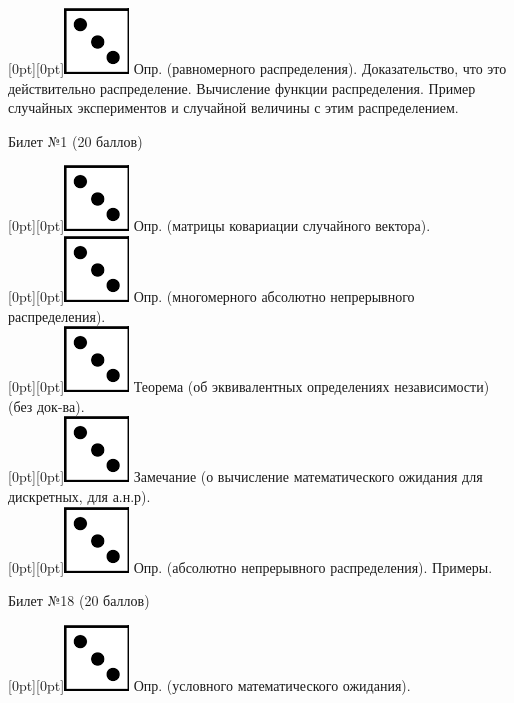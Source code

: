 \documentclass[10pt]{article}
\begin{document}
\raisebox{-1pt}[0pt][0pt]{\includegraphics[width=0.02\linewidth]{3.png}}  Опр. (равномерного распределения). Доказательство, что это действительно распределение. Вычисление функции распределения. Пример случайных экспериментов и случайной величины с этим распределением. \\

\begin{center} {\Large Билет №1 (20 баллов)} \end{center}

\raisebox{-1pt}[0pt][0pt]{\includegraphics[width=0.02\linewidth]{3.png}} Опр. (матрицы ковариации случайного вектора). \\

\raisebox{-1pt}[0pt][0pt]{\includegraphics[width=0.02\linewidth]{3.png}} Опр. (многомерного абсолютно непрерывного распределения). \\

\raisebox{-1pt}[0pt][0pt]{\includegraphics[width=0.02\linewidth]{3.png}} Теорема (об эквивалентных определениях независимости) (без док-ва). \\

\raisebox{-1pt}[0pt][0pt]{\includegraphics[width=0.02\linewidth]{3.png}} Замечание (о вычисление  математического ожидания для дискретных, для а.н.р). \\

\raisebox{-1pt}[0pt][0pt]{\includegraphics[width=0.02\linewidth]{3.png}} Опр. (абсолютно непрерывного распределения). Примеры. \\

\begin{center} {\Large Билет №18 (20 баллов)} \end{center}

\raisebox{-1pt}[0pt][0pt]{\includegraphics[width=0.02\linewidth]{3.png}} Опр. (условного математического ожидания). \\
\end{document}
